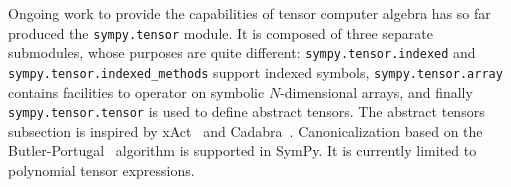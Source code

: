 Ongoing work to provide the capabilities of tensor computer algebra has so far
produced the \texttt{sympy.tensor} module.  It is composed of three separate
submodules, whose purposes are quite different: \texttt{sympy.tensor.indexed} and
\texttt{sympy.tensor.indexed\_methods} support indexed symbols,
\texttt{sympy.tensor.array} contains facilities to operator on symbolic $N$-dimensional
arrays, and finally \texttt{sympy.tensor.tensor} is used to define abstract tensors.
The abstract tensors subsection
is inspired by xAct~\cite{xAct} and Cadabra~\cite{Peeters2007cadabra}.
Canonicalization based on the Butler-Portugal~\cite{ManssurPortugal1999}
algorithm is supported in SymPy.  It is currently limited to polynomial tensor
expressions.
